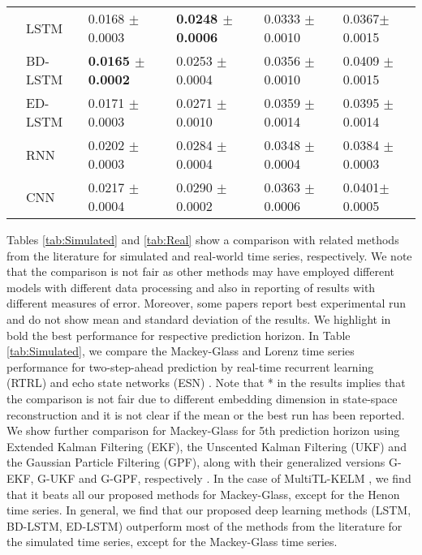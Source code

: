 \documentclass{ieeeaccess}
\begin{document}
\begin{table*}[htbp!]
\begin{tabular}{llllll}
&LSTM   & 0.0168 $\pm$   0.0003    	& \textbf{0.0248 $\pm$   0.0006}      &0.0333 $\pm$  0.0010	       &0.0367$\pm$   0.0015 \\

&BD-LSTM   &   \textbf{0.0165 $\pm$  0.0002}  	&  0.0253 $\pm$  0.0004     &0.0356 $\pm$ 0.0010& 0.0409 $\pm$  0.0015\\

&ED-LSTM   &   0.0171 $\pm$  0.0003     	&  0.0271 $\pm$ 0.0010       & 0.0359 $\pm$  0.0014 	       &0.0395 $\pm$  0.0014\\

&RNN  &   0.0202 $\pm$  0.0003   	&  0.0284 $\pm$ 0.0004     &0.0348 $\pm$ 0.0004 	       & 0.0384 $\pm$  0.0003\\

&CNN &  0.0217	$\pm$0.0004   	&   0.0290	$\pm$0.0002    &0.0363	$\pm$0.0006	       & 0.0401$\pm$	0.0005\\
\hline
\end{tabular}
\end{table*}

   
 Tables \ref{tab:Simulated} and \ref{tab:Real} show  a comparison with related methods from the 
literature for simulated and real-world time series, respectively. We 
note that the comparison is not  fair as other 
methods may have employed different models with different 
  data processing and also in reporting of results with 
different measures of error. Moreover, some papers report best experimental run and do not show mean and standard deviation of the results. We highlight in bold the best performance for respective prediction horizon.  In Table \ref{tab:Simulated}, we compare the Mackey-Glass and Lorenz time series 
performance for  two-step-ahead prediction by real-time recurrent 
learning (RTRL) and  echo state networks (ESN) \cite{chang2012reinforced}. Note 
that * in  the results  implies  that the comparison 
is  not fair due to  different embedding 
dimension in state-space reconstruction  and it is not clear if the mean or the best run has been 
reported. We show further comparison for Mackey-Glass for 5th prediction horizon 
using Extended Kalman Filtering (EKF), the Unscented Kalman Filtering (UKF) and 
the
 Gaussian Particle Filtering (GPF),  along with their    generalized   
versions G-EKF, G-UKF
 and G-GPF, respectively \cite{Wu2013AMC}. In the case of MultiTL-KELM \cite{YE2019227}, we find that it   beats all our proposed methods for Mackey-Glass, except for the Henon time series.  In general, we find that our proposed deep learning methods (LSTM, BD-LSTM, ED-LSTM) outperform most of the methods from the literature for the simulated time series, except for the Mackey-Glass time series. 
 
\end{document}
